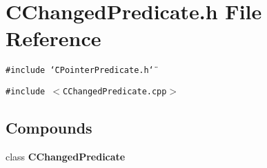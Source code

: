 \section{CChanged\-Predicate.h File Reference}
\label{CChangedPredicate_8h}
{\tt \#include \char`\"{}CPointer\-Predicate.h\char`\"{}}\par
{\tt \#include $<$CChanged\-Predicate.cpp$>$}\par
\subsection*{Compounds}
\begin{CompactItemize}
\item 
class {\bf CChanged\-Predicate}
\end{CompactItemize}
